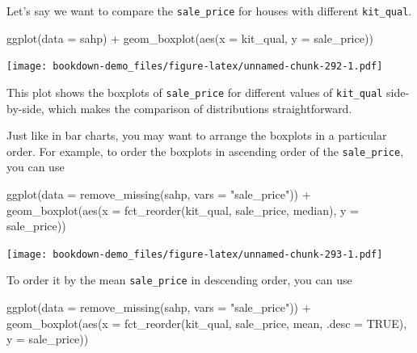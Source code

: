 \documentclass[
]{book}
\newenvironment{Shaded}{\begin{snugshade}}{\end{snugshade}}
\newcommand{\AttributeTok}[1]{\textcolor[rgb]{0.77,0.63,0.00}{#1}}
\newcommand{\ConstantTok}[1]{\textcolor[rgb]{0.00,0.00,0.00}{#1}}
\newcommand{\FunctionTok}[1]{\textcolor[rgb]{0.00,0.00,0.00}{#1}}
\newcommand{\NormalTok}[1]{#1}
\newcommand{\SpecialCharTok}[1]{\textcolor[rgb]{0.00,0.00,0.00}{#1}}
\newcommand{\StringTok}[1]{\textcolor[rgb]{0.31,0.60,0.02}{#1}}
\begin{document}
Let's say we want to compare the \texttt{sale\_price} for houses with different \texttt{kit\_qual}.

\begin{Shaded}
\begin{Highlighting}[]
\FunctionTok{ggplot}\NormalTok{(}\AttributeTok{data =}\NormalTok{ sahp) }\SpecialCharTok{+} \FunctionTok{geom\_boxplot}\NormalTok{(}\FunctionTok{aes}\NormalTok{(}\AttributeTok{x =}\NormalTok{ kit\_qual, }\AttributeTok{y =}\NormalTok{ sale\_price))}
\end{Highlighting}
\end{Shaded}

\texttt{[image: bookdown-demo\_files/figure-latex/unnamed-chunk-292-1.pdf]}

This plot shows the boxplots of \texttt{sale\_price} for different values of \texttt{kit\_qual} side-by-side, which makes the comparison of distributions straightforward.

Just like in bar charts, you may want to arrange the boxplots in a particular order. For example, to order the boxplots in ascending order of the \texttt{sale\_price}, you can use

\begin{Shaded}
\begin{Highlighting}[]
\FunctionTok{ggplot}\NormalTok{(}\AttributeTok{data =} \FunctionTok{remove\_missing}\NormalTok{(sahp, }\AttributeTok{vars =} \StringTok{"sale\_price"}\NormalTok{)) }\SpecialCharTok{+} \FunctionTok{geom\_boxplot}\NormalTok{(}\FunctionTok{aes}\NormalTok{(}\AttributeTok{x =} \FunctionTok{fct\_reorder}\NormalTok{(kit\_qual, sale\_price, median), }\AttributeTok{y =}\NormalTok{ sale\_price)) }
\end{Highlighting}
\end{Shaded}

\texttt{[image: bookdown-demo\_files/figure-latex/unnamed-chunk-293-1.pdf]}

To order it by the mean \texttt{sale\_price} in descending order, you can use

\begin{Shaded}
\begin{Highlighting}[]
\FunctionTok{ggplot}\NormalTok{(}\AttributeTok{data =} \FunctionTok{remove\_missing}\NormalTok{(sahp, }\AttributeTok{vars =} \StringTok{"sale\_price"}\NormalTok{)) }\SpecialCharTok{+} \FunctionTok{geom\_boxplot}\NormalTok{(}\FunctionTok{aes}\NormalTok{(}\AttributeTok{x =} \FunctionTok{fct\_reorder}\NormalTok{(kit\_qual, sale\_price, mean, }\AttributeTok{.desc =} \ConstantTok{TRUE}\NormalTok{), }\AttributeTok{y =}\NormalTok{ sale\_price)) }
\end{Highlighting}
\end{Shaded}
\end{document}
